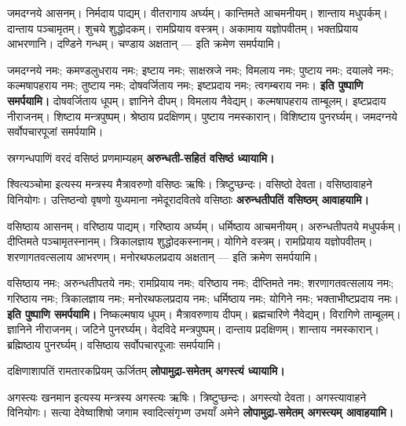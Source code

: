 जमदग्नये आसनम्। निर्मदाय पाद्यम्। वीतरागाय अर्घ्यम्। कान्तिमते आचमनीयम्।
शान्ताय मधुपर्कम्। दान्ताय पञ्चामृतम्। शुचये शुद्धोदकम्। रामप्रियाय वस्त्रम्।
अकामाय यज्ञोपवीतम्। भक्तप्रियाय आभरणानि। दण्डिने गन्धम्। चण्डाय अक्षतान्
— इति क्रमेण समर्पयामि।

जमदग्नये नमः; कमण्डलुधराय नमः; इष्टाय नमः; साक्षस्रजे नमः; विमलाय नमः; पुष्टाय नमः; दयालवे नमः; कल्मषापहराय नमः; तुष्टाय नमः; दोषवर्जिताय नमः; इष्टप्रदाय नमः; त्वगम्बराय नमः।
\textbf{इति पुष्पाणि समर्पयामि।} दोषवर्जिताय धूपम्। ज्ञानिने दीपम्। विमलाय
नैवेद्यम्। कल्मषापहराय ताम्बूलम्। इष्टप्रदाय नीराजनम्। शिष्टाय मन्त्रपुष्पम्।
श्रेष्ठाय प्रदक्षिणम्। पुष्टाय नमस्कारान्। विशिष्टाय पुनरर्घ्यम्। जमदग्नये
सर्वोपचारपूजां समर्पयामि।

{स्रग्गन्धपाणिं वरदं वसिष्ठं प्रणमाम्यहम्}
\textbf{अरुन्धती-सहितं वसिष्ठं ध्यायामि।}

श्वित्यञ्चोमा इत्यस्य मन्त्रस्य मैत्रावरुणो वसिष्ठः ऋषिः। त्रिष्टुप्छन्दः। वसिष्ठो
देवता। वसिष्ठावाहने विनियोगः।
{उत्तिष्ठन्वो वृषणो युध्यमाना नमेदूरादवितवे वसिष्ठाः}
\textbf{अरुन्धतीपतिं वसिष्ठम् आवाहयामि।}

वसिष्ठाय आसनम्। वरिष्ठाय पाद्यम्। गरिष्ठाय अर्घ्यम्। धर्मिष्ठाय आचमनीयम्।
अरुन्धतीपतये मधुपर्कम्। दीप्तिमते पञ्चामृतस्नानम्। त्रिकालज्ञाय
शुद्धोदकस्नानम्। योगिने वस्त्रम्। रामप्रियाय यज्ञोपवीतम्।
शरणागतवत्सलाय आभरणम्। मनोरथफलप्रदाय अक्षतान् — इति क्रमेण समर्पयामि।

वसिष्ठाय नमः; अरुन्धतीपतये नमः; रामप्रियाय नमः; वरिष्ठाय नमः; दीप्तिमते नमः; शरणागतवत्सलाय नमः; गरिष्ठाय नमः; त्रिकालज्ञाय नमः; मनोरथफलप्रदाय नमः; धर्मिष्ठाय नमः; योगिने नमः; भक्ताभीष्टप्रदाय नमः।
\textbf{इति पुष्पाणि समर्पयामि।} निष्कल्मषाय धूपम्। मैत्रावरुणाय दीपम्।
ब्रह्मचारिणे नैवेद्यम्। विरागिणे ताम्बूलम्। ज्ञानिने नीराजनम्। जटिने पुनरर्घ्यम्।
वेदविदे मन्त्रपुष्पम्। दान्ताय प्रदक्षिणम्। शान्ताय नमस्कारान्। ब्रह्मिष्ठाय
पुनरर्घ्यम्। वसिष्ठाय सर्वोपचारपूजाः समर्पयामि।

{दक्षिणाशापतिं रामतारकप्रियम् ऊर्जितम्}
\textbf{लोपामुद्रा-समेतम् अगस्त्यं ध्यायामि।}

अगस्त्यः खनमान इत्यस्य मन्त्रस्य अगस्त्यः ऋषिः। त्रिष्टुप्छन्दः। अगस्त्यो देवता।
अगस्त्यावाहने विनियोगः।
{सत्या देवेष्वाशिषो जगाम स्वादित्संगृभ्ण उभयाँ अमेने}
\textbf{लोपामुद्रा-समेतम् अगस्त्यम् आवाहयामि।}

